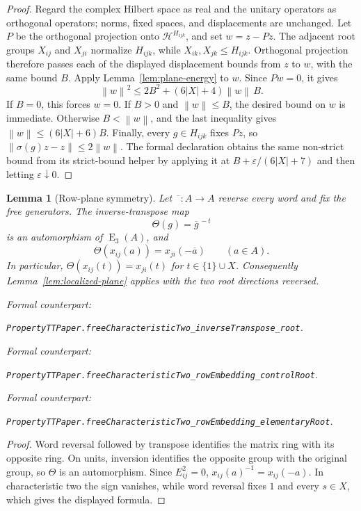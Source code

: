 \documentclass[11pt]{amsart}
\newif\ifanonymous\anonymoustrue
\newcommand{\leanrepo}{[repository link removed for anonymous review]}
\newcommand{\leanrepo}{https://github.com/SauersML/group-approximation}
\newcommand{\leanverified}[2]{%
  \par\smallskip\noindent
  {\normalfont\footnotesize\color{gray!70!black}%
  Formal counterpart:\par\nobreak\noindent
  \ifanonymous\nolinkurl{#2}\else
  \href{\leanrepo/blob/main/GroupApproximation/#1.lean}{\nolinkurl{#2}}\fi.}}
\newtheorem{lemma}[theorem]{Lemma}
\theoremstyle{definition}
\theoremstyle{plain}
\newcommand{\EL}{\operatorname{E}}
\newcommand{\norm}[1]{\left\lVert#1\right\rVert}
\newcommand{\abs}[1]{\left\lvert#1\right\rvert}
\begin{document}
\begin{proof}
Regard the complex Hilbert space as real and the unitary operators as
orthogonal operators; norms, fixed spaces, and displacements are
unchanged.  Let \(P\) be the orthogonal projection onto
\(\mathcal H^{H_{ijk}}\), and set \(w=z-Pz\).  The adjacent root
groups \(X_{ij}\) and \(X_{ji}\) normalize \(H_{ijk}\), while
\(X_{ik},X_{jk}\le H_{ijk}\).  Orthogonal projection therefore
passes each of the displayed displacement bounds from \(z\) to
\(w\), with the same bound \(B\).
Apply Lemma~\ref{lem:plane-energy} to \(w\).  Since \(Pw=0\), it
gives
\[
  \norm w^2
  \le 2B^2+(6\abs X+4)\norm w\,B.
\]
If \(B=0\), this forces \(w=0\).  If \(B>0\) and
\(\norm w\le B\), the desired bound on \(w\) is immediate.
Otherwise \(B<\norm w\), and the last inequality gives
\(\norm w\le(6\abs X+6)B\).  Finally, every \(g\in H_{ijk}\)
fixes \(Pz\), so
\(\norm{\sigma(g)z-z}\le2\norm w\).
The formal declaration obtains the same non-strict bound from its
strict-bound helper by applying it at
\(B+\varepsilon/(6\lvert X\rvert+7)\) and then letting
\(\varepsilon\downarrow0\).
\end{proof}

\begin{lemma}[Row-plane symmetry]\label{lem:row-symmetry}
Let \(\overline{\phantom a}:A\to A\) reverse every word and fix the
free generators.  The inverse-transpose map
\[
 \Theta(g)=\overline{g}^{\,-t}
\]
is an automorphism of \(\EL_3(A)\), and
\[
 \Theta(x_{ij}(a))=x_{ji}(-\overline a)
 \qquad(a\in A).
\]
In particular, \(\Theta(x_{ij}(t))=x_{ji}(t)\) for
\(t\in\{1\}\cup X\).
Consequently Lemma~\ref{lem:localized-plane} applies with the two
root directions reversed.
\leanverified{PropertyTT/PaperStatements}{PropertyTTPaper.freeCharacteristicTwo_inverseTranspose_root}
\leanverified{PropertyTT/PaperStatements}{PropertyTTPaper.freeCharacteristicTwo_rowEmbedding_controlRoot}
\leanverified{PropertyTT/PaperStatements}{PropertyTTPaper.freeCharacteristicTwo_rowEmbedding_elementaryRoot}
\end{lemma}

\begin{proof}
Word reversal followed by transpose identifies the matrix ring with
its opposite ring.  On units, inversion identifies the opposite
group with the original group, so \(\Theta\) is an automorphism.
Since \(E_{ij}^2=0\),
\(x_{ij}(a)^{-1}=x_{ij}(-a)\).  In characteristic two the sign
vanishes, while word reversal fixes \(1\) and every \(s\in X\),
which gives the displayed formula.
\end{proof}
\end{document}
